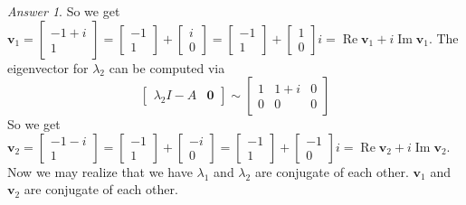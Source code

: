 \documentclass{beamer}
\theoremstyle{definition}
\theoremstyle{remark}
\newtheorem*{answer}{Answer}
\begin{document}
\begin{frame}[t]
\begin{answer}
So we get $\mathbf v_1=\begin{bmatrix}
-1+i\\1
\end{bmatrix}=\begin{bmatrix}
-1\\1
\end{bmatrix}+\begin{bmatrix}
i\\0
\end{bmatrix}=\begin{bmatrix}
-1\\1
\end{bmatrix}+\begin{bmatrix}
1\\0
\end{bmatrix}i=\operatorname{Re}\mathbf v_1+i\operatorname{Im}\mathbf v_1$\pause. The eigenvector for $\lambda_2$ can be computed via
\[
\left[\begin{array}{c|c}
\lambda_2I-A&\mathbf0
\end{array}\right]\sim\left[\begin{array}{cc|c}
1&1+i&0\\
0&0&0
\end{array}\right]
\]
So we get $\mathbf v_2=\begin{bmatrix}
-1-i\\1
\end{bmatrix}=\begin{bmatrix}
-1\\1
\end{bmatrix}+\begin{bmatrix}
-i\\0
\end{bmatrix}=\begin{bmatrix}
-1\\1
\end{bmatrix}+\begin{bmatrix}
-1\\0
\end{bmatrix}i=\operatorname{Re}\mathbf v_2+i\operatorname{Im}\mathbf v_2$\pause. Now we may realize that we have $\lambda_1$ and $\lambda_2$ are conjugate of each other. $\mathbf v_1$ and $\mathbf v_2$ are conjugate of each other.
\end{answer}
\end{frame}
\end{document}
